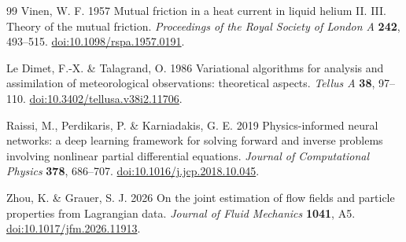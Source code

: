 \documentclass[11pt]{article}
\numberwithin{equation}{section}
\begin{document}
\begin{thebibliography}{99}
Vinen, W. F. 1957
Mutual friction in a heat current in liquid helium II.
III. Theory of the mutual friction.
\textit{Proceedings of the Royal Society of London A} \textbf{242}, 493--515.
\href{https://doi.org/10.1098/rspa.1957.0191}{doi:10.1098/rspa.1957.0191}.

Le Dimet, F.-X. \& Talagrand, O. 1986
Variational algorithms for analysis and assimilation of meteorological observations:
theoretical aspects.
\textit{Tellus A} \textbf{38}, 97--110.
\href{https://doi.org/10.3402/tellusa.v38i2.11706}{doi:10.3402/tellusa.v38i2.11706}.

Raissi, M., Perdikaris, P. \& Karniadakis, G. E. 2019
Physics-informed neural networks: a deep learning framework for solving
forward and inverse problems involving nonlinear partial differential equations.
\textit{Journal of Computational Physics} \textbf{378}, 686--707.
\href{https://doi.org/10.1016/j.jcp.2018.10.045}{doi:10.1016/j.jcp.2018.10.045}.

Zhou, K. \& Grauer, S. J. 2026
On the joint estimation of flow fields and particle properties from Lagrangian data.
\textit{Journal of Fluid Mechanics} \textbf{1041}, A5.
\href{https://doi.org/10.1017/jfm.2026.11913}{doi:10.1017/jfm.2026.11913}.

\end{thebibliography}
\end{document}
